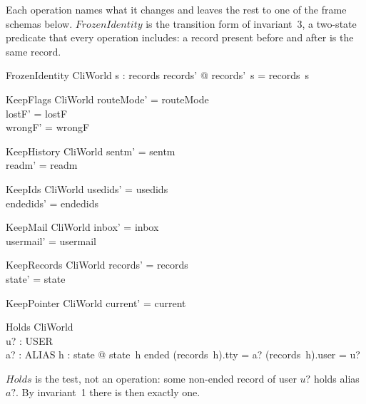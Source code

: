 \documentclass[a4paper,10pt,fleqn]{article}
\begin{document}
Each operation names what it changes and leaves the rest to one of the
frame schemas below.  $FrozenIdentity$ is the transition form of
invariant~3, a two-state predicate that every operation includes: a
record present before and after is the same record.

\begin{schema}{FrozenIdentity}
  \Delta CliWorld
  \where
  \forall s : \dom records \cap \dom records' @ records'~s = records~s
\end{schema}

\begin{schema}{KeepFlags}
  \Delta CliWorld
  \where
  routeMode' = routeMode \\
  lostF' = lostF \\
  wrongF' = wrongF
\end{schema}

\begin{schema}{KeepHistory}
  \Delta CliWorld
  \where
  sentm' = sentm \\
  readm' = readm
\end{schema}

\begin{schema}{KeepIds}
  \Delta CliWorld
  \where
  usedids' = usedids \\
  endedids' = endedids
\end{schema}

\begin{schema}{KeepMail}
  \Delta CliWorld
  \where
  inbox' = inbox \\
  usermail' = usermail
\end{schema}

\begin{schema}{KeepRecords}
  \Delta CliWorld
  \where
  records' = records \\
  state' = state
\end{schema}

\begin{schema}{KeepPointer}
  \Delta CliWorld
  \where
  current' = current
\end{schema}

\begin{schema}{Holds}
  CliWorld \\
  u? : USER \\
  a? : ALIAS
  \where
  \exists h : \dom state @
    state~h \neq ended
      \land (records~h).tty = a?
      \land (records~h).user = u?
\end{schema}

$Holds$ is the test, not an operation: some non-ended record of user
$u?$ holds alias $a?$.  By invariant~1 there is then exactly one.
\end{document}
